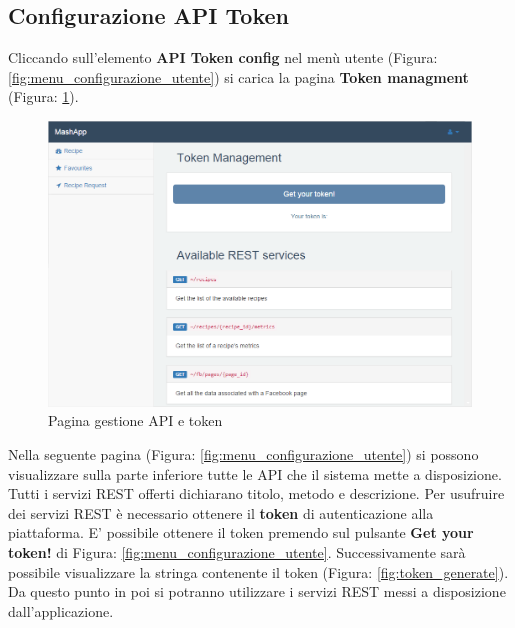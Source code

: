 	\pagebreak
	\subsection{Configurazione API Token} %
	\label{sec:settings_utente}
		Cliccando sull'elemento \textbf{API Token config} nel menù utente (Figura: \ref{fig:menu_configurazione_utente}) si carica la pagina \textbf{Token\gloss{} managment} (Figura: \ref{fig:token_config}).
		\begin{figure}[H]
			\centering
			\centerline{\includegraphics[width=14cm]{images/token_config.png}}
			\caption{Pagina gestione API e token}
			\label{fig:token_config}
		\end{figure}
		Nella seguente pagina (Figura: \ref{fig:menu_configurazione_utente}) si possono visualizzare sulla parte inferiore tutte le API\gloss{} che il sistema mette a disposizione. Tutti i servizi REST\gloss{} offerti dichiarano titolo, metodo e descrizione.\newline
		Per usufruire dei servizi REST\gloss{} è necessario ottenere il \textbf{token}\gloss{} di autenticazione\gloss{} alla piattaforma.\newline 
		E' possibile ottenere il token\gloss{} premendo sul pulsante \textbf{Get your token!} di Figura: \ref{fig:menu_configurazione_utente}.\newline
		Successivamente sarà possibile visualizzare la stringa contenente il token\gloss{} (Figura: \ref{fig:token_generate}). Da questo punto in poi si potranno utilizzare i servizi REST\gloss{} messi a disposizione dall'applicazione.
